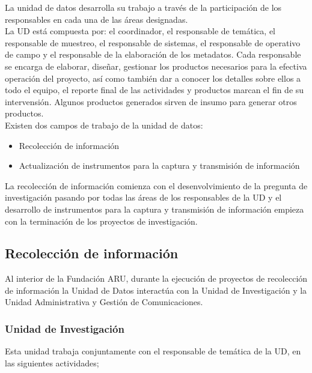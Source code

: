 \documentclass{article}
\begin{document}
La unidad de datos desarrolla su trabajo a través de la participación de los responsables en cada una de las áreas designadas.\\

La UD está compuesta por: el coordinador, el responsable de temática, el responsable de muestreo, el responsable de sistemas, el responsable de operativo de campo y el responsable de la elaboración de los metadatos. Cada responsable se encarga de elaborar, diseñar, gestionar los productos necesarios para la efectiva operación del proyecto,  así como también dar a conocer los detalles sobre ellos a todo el equipo, el reporte final de las actividades y productos  marcan el fin de su intervensión. Algunos productos generados  sirven de insumo para generar otros productos.\\

Existen dos campos de trabajo de la unidad de datos:

\begin{itemize}
\item Recolección de información 
\item Actualización de instrumentos para la captura y transmisión de información
\end{itemize}

La recolección de información comienza con el desenvolvimiento de la pregunta de investigación pasando por todas las áreas de los responsables de la UD y el desarrollo de instrumentos para la captura y transmisión de información empieza con la terminación de los proyectos de investigación.

\subsection{Recolección de información}

Al interior de la Fundación ARU, durante la ejecución de proyectos de recolección de información la Unidad de Datos interactúa con la Unidad de Investigación y la Unidad Administrativa y Gestión de Comunicaciones.


\subsubsection{Unidad de Investigación}

Esta unidad trabaja conjuntamente con el responsable de temática de la UD, en las siguientes actividades; 
\end{document}
